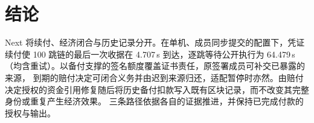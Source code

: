 \section{结论}
\label{sec:conclusion}

Next 将续付、经济闭合与历史记录分开。在单机、成员同步提交的配置下，凭证续付使 100 跳链的最后一次收据在
4.707\,s 到达，逐跳等待公开执行为 64.479\,s（均含重试）。以备付支撑的签名额度覆盖证书责任，原签署成员可补交已暴露的来源，
到期的赔付决定可闭合义务并由迟到来源归还，适配暂停时亦然。由赔付决定授权的资金引用修复随后将历史备付扣款写入既有区块记录，而不改变其完整身份或重复产生经济效果。
三条路径依据各自的证据推进，并保持已完成付款的授权与输出。

